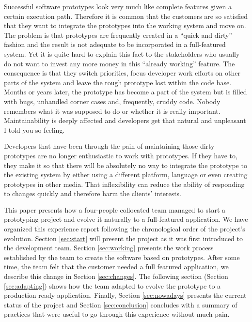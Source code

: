\documentclass[lnbip]{svmultln}
\begin{document}
Successful software prototypes look very much like complete features
given a certain execution path. Therefore it is common that the
customers are so satisfied that they want to integrate the prototypes
into the working system and move on. The problem is that prototypes
are frequently created in a ``quick and dirty'' fashion and the result
is not adequate to be incorporated in a full-featured system. Yet it
is quite hard to explain this fact to the stakeholders who usually do
not want to invest any more money in this ``already working''
feature. The consequence is that they switch priorities, focus
developer work efforts on other parts of the system and leave the
rough prototype lost within the code base. Months or years later, the
prototype has become a part of the system but is filled with bugs,
unhandled corner cases and, frequently, cruddy code. Nobody remembers
what it was supposed to do or whether it is really
important. Maintainability is deeply affected and developers get that
natural and unpleasant I-told-you-so feeling. %

Developers that have been through the pain of maintaining those dirty
prototypes are no longer enthusiastic to work with prototypes. If they
have to, they make it so that there will be absolutely no way to
integrate the prototype to the existing system by either using a
different platform, language or even creating prototypes in other
media. That inflexibility can reduce the ability of responding to
changes quickly and therefore harm the clients' interests.

This paper presents how a four-people collocated team managed to start
a prototyping project and evolve it naturally to a full-featured
application.  We have organized this experience report following the
chronological order of the project's evolution. Section
\ref{sec:start} will present the project as it was first introduced to
the development team. Section \ref{sec:working} presents the work
process established by the team to create the software based on
prototypes. After some time, the team felt that the customer needed a
full featured application, we describe this change in Section
\ref{sec:changes}. The following section (Section \ref{sec:adapting})
shows how the team adapted to evolve the prototype to a production
ready application. Finally, Section \ref{sec:nowadays} presents the
current status of the project and Section \ref{sec:conclusion}
concludes with a summary of practices that were useful to go through
this experience without much pain.
\end{document}
